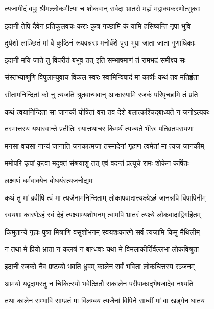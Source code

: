 \twolineshloka
{त्यजामीदं वपुः श्रीमल्लोकभीत्या च शोकवान्}
{सर्वदा भ्रातरो मह्यं मद्वाक्यकरणोत्सुकाः}%

\twolineshloka
{इदानीं तेपि दैवेन प्रतिकूलवचः कराः}
{कुत्र गच्छामि कं यामि हसिष्यन्ति नृपा भुवि}%

\twolineshloka
{दुर्यशो लाञ्छितं मां वै कुष्ठिनं रूपवन्नराः}
{मनोर्वंशे पुरा भूपा जाता जाता गुणाधिकाः}%

\twolineshloka
{इदानीं मयि जाते तु विपरीतं बभूव तत्}
{इति सम्भाषमाणं तं रामभद्रं समीक्ष्य सः}%

\twolineshloka
{संस्तभ्याश्रूणि विपुलान्युवाच विकल स्वरः}
{स्वामिन्विषादं मा कार्षीः कथं तव मतिर्हृता}%

\twolineshloka
{सीतामनिन्दितां को नु त्यजति श्रुतवान्भवान्}
{आकारयामि रजकं परिपृच्छामि तं प्रति}%

\twolineshloka
{कथं त्वयानिन्दिता सा जानकी योषितां वरा}
{तव देशे बलात्कश्चिद्बाध्यते न जनोऽल्पकः}%

\twolineshloka
{तस्मात्तस्य यथास्वान्ते प्रतीतिः स्यात्तथाचर}
{किमर्थं त्यज्यते भीरुः पतिव्रतपरायणा}%

\twolineshloka
{मनसा वचसा नान्यं जानाति जनकात्मजा}
{तस्मादेनां गृहाण त्वमेतां मा त्यज जानकीम्}%

\twolineshloka
{ममोपरि कृपां कृत्वा मदुक्तं संश्रयाशु तत्}
{एवं वदन्तं प्रत्यूचे रामः शोकेन कर्षितः}%

\onelineshloka
{लक्ष्मणं धर्मवाक्येन बोधयंस्त्यजनोद्यमः}%


\twolineshloka
{कथं तु मां ब्रवीषि त्वं मा त्यजैनामनिन्दिताम्}
{लोकापवादात्त्यक्ष्येऽहं जानन्नपि विपापिनीम्}%

\twolineshloka
{स्वयशः कारणेऽहं स्वं देहं त्यक्ष्याम्यशोभनम्}
{त्वामपि भ्रातरं त्यक्ष्ये लोकवादाद्विगर्हितम्}%

\twolineshloka
{किमुतान्ये गृहाः पुत्रा मित्राणि वसुशोभनम्}
{स्वयशःकारणे सर्वं त्यजामि किमु मैथिलीम्}%

\twolineshloka
{न तथा मे प्रियो भ्राता न कलत्रं न बान्धवाः}
{यथा मे विमलाकीर्तिर्वल्लभा लोकविश्रुता}%

\twolineshloka
{इदानीं रजको नैव प्रष्टव्यो भवति ध्रुवम्}
{कालेन सर्वं भविता लोकचित्तस्य रञ्जनम्}%

\twolineshloka
{आमयो यद्वदामस्तु न चिकित्स्यो भवेत्क्षितौ}
{सकालेन परीपाकाद्भेषजादेव नश्यति}%

\twolineshloka
{तथा कालेन सम्भावि साम्प्रतं मा विलम्बय}
{त्यजैनां विपिने साध्वीं मां वा खड्गेन घातय}%

